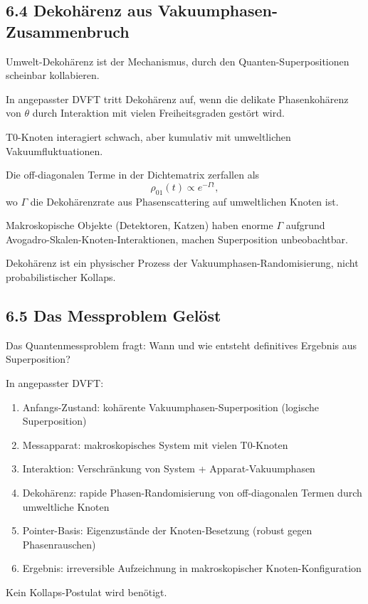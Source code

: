 	\subsection{6.4 Dekohärenz aus Vakuumphasen-Zusammenbruch}
	
	Umwelt-Dekohärenz ist der Mechanismus, durch den Quanten-Superpositionen scheinbar kollabieren.
	
	In angepasster DVFT tritt Dekohärenz auf, wenn die delikate Phasenkohärenz von $\theta$ durch Interaktion mit vielen Freiheitsgraden gestört wird.
	
	T0-Knoten interagiert schwach, aber kumulativ mit umweltlichen Vakuumfluktuationen.
	
	Die off-diagonalen Terme in der Dichtematrix zerfallen als
	\[
	\rho_{01}(t) \propto e^{-\Gamma t},
	\]
	wo $\Gamma$ die Dekohärenzrate aus Phasenscattering auf umweltlichen Knoten ist.
	
	Makroskopische Objekte (Detektoren, Katzen) haben enorme $\Gamma$ aufgrund Avogadro-Skalen-Knoten-Interaktionen, machen Superposition unbeobachtbar.
	
	Dekohärenz ist ein physischer Prozess der Vakuumphasen-Randomisierung, nicht probabilistischer Kollaps.
	
	\subsection{6.5 Das Messproblem Gelöst}
	
	Das Quantenmessproblem fragt: Wann und wie entsteht definitives Ergebnis aus Superposition?
	
	In angepasster DVFT:
	\begin{enumerate}
		\item Anfangs-Zustand: kohärente Vakuumphasen-Superposition (logische Superposition)
		\item Messapparat: makroskopisches System mit vielen T0-Knoten
		\item Interaktion: Verschränkung von System + Apparat-Vakuumphasen
		\item Dekohärenz: rapide Phasen-Randomisierung von off-diagonalen Termen durch umweltliche Knoten
		\item Pointer-Basis: Eigenzustände der Knoten-Besetzung (robust gegen Phasenrauschen)
		\item Ergebnis: irreversible Aufzeichnung in makroskopischer Knoten-Konfiguration
	\end{enumerate}
	
	Kein Kollaps-Postulat wird benötigt.
	
